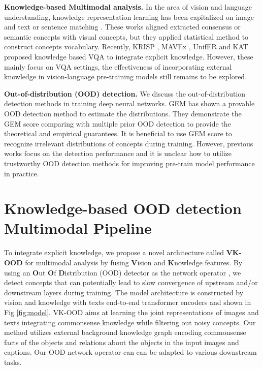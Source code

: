 \documentclass{article}
\begin{document}
\textbf{Knowledge-based Multimodal analysis.} In the area of vision and language understanding, knowledge representation learning has been capitalized on image and text or sentence matching \cite{huang2018learning, garderes2020conceptbert, wang2020consensus}. These works aligned extracted consensus or semantic concepts with visual concepts, but they applied statistical method to construct concepts vocabulary. Recently, KRISP \cite{marino2021krisp}, MAVEx \cite{wu2022multi}, UnifER \cite{guo2022unified} and KAT \cite{gui2021kat} proposed knowledge based VQA to integrate explicit knowledge. However, these mainly focus on VQA settings, the effectiveness of incorporating external knowledge in vision-language pre-training models still remains to be explored. 





\textbf{Out-of-distribution (OOD) detection.} We discuss the out-of-distribution detection methods in training deep neural networks. GEM \cite{morteza2022provable} has shown a provable OOD detection method to estimate the distributions. They demonstrate the GEM score comparing with multiple prior OOD detection to provide the theoretical and empirical guarantees. It is beneficial to use GEM score to recognize irrelevant distributions of concepts during training. However, previous works focus on the detection performance and it is unclear how to utilize trustworthy OOD detection methods for improving pre-train model performance in practice. 

\section{Knowledge-based OOD detection Multimodal Pipeline}
To integrate explicit knowledge, we propose a novel architecture called \textbf{VK-OOD} for multimodal analysis by fusing \textbf{V}ision and \textbf{K}nowledge features. By using an {\bf O}ut {\bf O}f {\bf D}istribution (OOD) detector as the network operator , we detect concepts that can potentially lead to slow convergence of upstream and/or downstream layers during training. The model architecture is constructed by vision and knowledge with texts end-to-end transformer encoders and shown in Fig \ref{fig:model}. VK-OOD aims at learning the joint representations of images and texts integrating commonsense knowledge while filtering out noisy concepts. Our method utilizes external background knowledge graph encoding commonsense facts of the objects and relations about the objects in the input images and captions. Our OOD network operator can can be adapted to various downstream tasks. 
\end{document}
